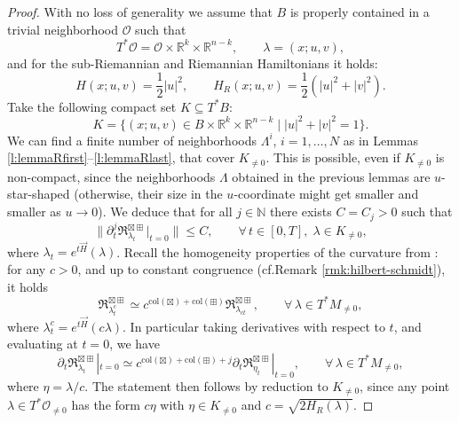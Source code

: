 \documentclass[11pt,a4paper]{article}
\theoremstyle{plain}
\theoremstyle{definition}
\theoremstyle{remark}
\numberwithin{equation}{section}
\newcommand{\R}{\mathbb{R}} %
\newcommand{\N}{\mathbb{N}} %
\newcommand{\col}{\mathrm{col}}
\begin{document}
\begin{proof}
With no loss of generality we assume that $B$ is properly contained in a trivial neighborhood $\mathcal{O}$ such that
\begin{equation}
T^*\mathcal{O} = \mathcal{O}\times \R^{k}\times \R^{n-k} , \qquad \lambda = (x;u,v),
\end{equation}
and for  the sub-Riemannian and Riemannian Hamiltonians it holds:
\begin{equation}
H(x;u,v) = \frac{1}{2}|u|^2,\qquad H_R(x;u,v) = \frac{1}{2}(|u|^2+|v|^2).
\end{equation}
Take the following compact set $K \subseteq T^*B$:
\begin{equation}\label{eq:Kset}
K = \{(x;u,v)\in B\times \R^k\times \R^{n-k}\mid |u|^2+|v|^2 = 1\}.
\end{equation}
We can find a finite number of neighborhoods $\Lambda^i$, $i=1,\dots,N$ as in Lemmas \ref{l:lemmaRfirst}--\ref{l:lemmaRlast}, that cover $K_{\neq 0}$. This is possible, even if $K_{\neq 0}$ is non-compact, since the neighborhoods $\Lambda$ obtained in the previous lemmas are $u$-star-shaped (otherwise, their size in the $u$-coordinate might get smaller and smaller as $u\to0$). We deduce that for all $j\in \N$ there exists $C=C_j>0$ such that
\begin{equation}
\|\partial_t^j\mathfrak{R}_{\lambda_t}^{\boxtimes\boxplus}|_{t=0}\| \leq C, \qquad  \forall\, t\in [0,T],\; \lambda \in K_{\neq 0},
\end{equation}
where $\lambda_t = e^{t\vec{H}}(\lambda)$. Recall the homogeneity properties of the curvature from \cite[Thm.\@ 4.7]{BR-Connection}: for any $c>0$, and up to constant congruence (cf.\@ Remark \ref{rmk:hilbert-schmidt}), it holds
\begin{equation}
\mathfrak{R}_{\lambda^c_t}^{\boxtimes\boxplus} \simeq c^{\col(\boxtimes) + \col(\boxplus)}\mathfrak{R}_{\lambda_{ct}}^{\boxtimes\boxplus}, \qquad \forall\, \lambda \in T^*M_{\neq 0},
\end{equation}
where $\lambda^c_t = e^{t\vec{H}}(c\lambda)$. In particular taking derivatives with respect to $t$, and evaluating at $t=0$, we have
\begin{equation}
\partial_t \mathfrak{R}_{\lambda_t}^{\boxtimes\boxplus}|_{t=0} \simeq c^{\col(\boxtimes) + \col(\boxplus) + j}\partial_t \mathfrak{R}_{\eta_t}^{\boxtimes\boxplus}|_{t=0}, \qquad \forall\, \lambda \in T^*M_{\neq 0},
\end{equation}
where $\eta = \lambda/c$. The statement then follows by reduction to $K_{\neq 0}$, since any point $\lambda \in T^*\mathcal{O}_{\neq 0}$ has the form $c \eta$ with $\eta \in K_{\neq 0}$ and $c= \sqrt{2H_R(\lambda)}$.


\end{proof}
\end{document}
